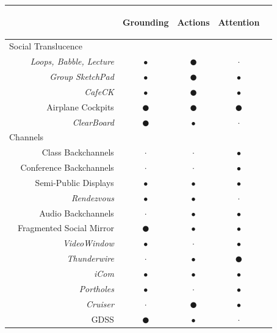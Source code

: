 \documentclass{tufte-handout}
\begin{document}
\begin{table}[tb]

\begin{tabular}{lrcccl}

& & \begin{sideways}Grounding\end{sideways} & \begin{sideways}Actions\end{sideways} & \begin{sideways}Attention\end{sideways} \\
\midrule


\multicolumn{2}{l}{Social Translucence} & & & & \\
\midrule

& \emph{Loops, Babble, Lecture} &$\bullet$& $\CIRCLE$ & $\cdot$ & \citep{Erickson:2000kb} \\
& \emph{Group SketchPad} &$\bullet$& $\CIRCLE$ &$\bullet$& \citep{Gutwin:2002tf} \\
& \emph{CafeCK} &$\bullet$& $\CIRCLE$ &$\bullet$& \citep{Ackerman:1995tj} \\
& Airplane Cockpits & $\CIRCLE$ & $\CIRCLE$ & $\CIRCLE$ & \citep{Hutchins:1995ud} \\
& \emph{ClearBoard} & $\CIRCLE$ &$\bullet$& $\cdot$ & \citep{Ishii:1992bq} \\
\midrule


\multicolumn{2}{l}{Channels} & & & & \\
\midrule
& Class Backchannels & $\cdot$ & $\cdot$ &$\bullet$& \citep{Yardi:2006uk} \\
& Conference Backchannels & $\cdot$ & $\cdot$ &$\bullet$& \citep{McCarthy:2004im} \\
& Semi-Public Displays &$\bullet$&$\bullet$&$\bullet$& \citep{Huang:2003ef} \\
& \emph{Rendezvous} &$\bullet$&$\bullet$& $\cdot$ & \citep{Kellogg:2006vn} \\
& Audio Backchannels & $\cdot$ &$\bullet$&$\bullet$& \citep{Yankelovich:2005bx} \\
& Fragmented Social Mirror & $\CIRCLE$ & $\bullet$ & $\bullet$ & \citep{Bergstrom:2011wl} \\
& \emph{VideoWindow} &$\bullet$& $\cdot$ &$\bullet$& \citep{Fish:1990fn} \\
& \emph{Thunderwire} & $\cdot$ &$\bullet$& $\CIRCLE$ & \citep{Hindus:1996cn} \\
& \emph{iCom} &$\bullet$&$\bullet$&$\bullet$& \citep{Agamanolis:2006vh} \\
& \emph{Portholes} &$\bullet$& $\cdot$ &$\bullet$& \citep{Dourish:1992fu} \\
& \emph{Cruiser} & $\cdot$ & $\CIRCLE$ &$\bullet$& \citep{Fish:1992vz} \\
& GDSS & $\CIRCLE$ &$\bullet$& $\cdot$ & \citep{Nunamaker:1991gk} \\


\end{tabular}
\end{table}
\end{document}
